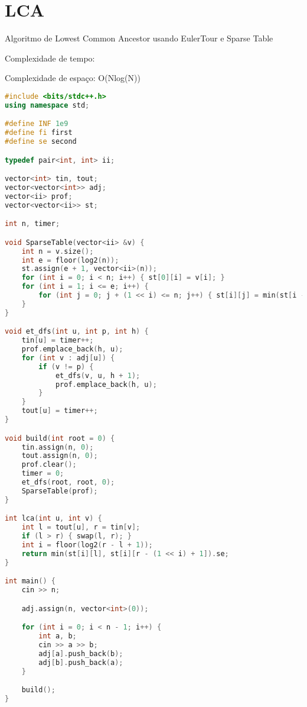 \documentclass[11pt, a4paper, twoside]{book}
\begin{document}
\section{LCA}



Algoritmo de Lowest Common Ancestor usando EulerTour e Sparse Table



Complexidade de tempo:





Complexidade de espaço: O(Nlog(N))


\hfill

\begin{lstlisting}[language=C++]
#include <bits/stdc++.h>
using namespace std;

#define INF 1e9
#define fi first
#define se second

typedef pair<int, int> ii;

vector<int> tin, tout;
vector<vector<int>> adj;
vector<ii> prof;
vector<vector<ii>> st;

int n, timer;

void SparseTable(vector<ii> &v) {
    int n = v.size();
    int e = floor(log2(n));
    st.assign(e + 1, vector<ii>(n));
    for (int i = 0; i < n; i++) { st[0][i] = v[i]; }
    for (int i = 1; i <= e; i++) {
        for (int j = 0; j + (1 << i) <= n; j++) { st[i][j] = min(st[i - 1][j], st[i - 1][j + (1 << (i - 1))]); }
    }
}

void et_dfs(int u, int p, int h) {
    tin[u] = timer++;
    prof.emplace_back(h, u);
    for (int v : adj[u]) {
        if (v != p) {
            et_dfs(v, u, h + 1);
            prof.emplace_back(h, u);
        }
    }
    tout[u] = timer++;
}

void build(int root = 0) {
    tin.assign(n, 0);
    tout.assign(n, 0);
    prof.clear();
    timer = 0;
    et_dfs(root, root, 0);
    SparseTable(prof);
}

int lca(int u, int v) {
    int l = tout[u], r = tin[v];
    if (l > r) { swap(l, r); }
    int i = floor(log2(r - l + 1));
    return min(st[i][l], st[i][r - (1 << i) + 1]).se;
}

int main() {
    cin >> n;

    adj.assign(n, vector<int>(0));

    for (int i = 0; i < n - 1; i++) {
        int a, b;
        cin >> a >> b;
        adj[a].push_back(b);
        adj[b].push_back(a);
    }

    build();
}
\end{lstlisting}
\end{document}
